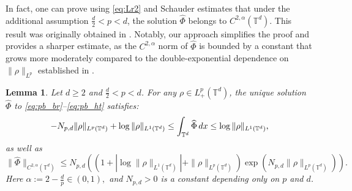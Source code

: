 \documentclass[11pt,reqno,a4paper]{amsart}
\newcommand{\intt}{\int_{\T^d}}
\newtheorem{lemma}{Lemma}[section]
\theoremstyle{definition}
\theoremstyle{remark}
\numberwithin{equation}{section}
\newcommand{\T} {\mathbb T}
\newcommand{\lt}{\left}
\newcommand{\rt}{\right}
\newcommand{\dx}{\textnormal{d}x}
\begin{document}
In fact, one can prove using \eqref{eq:Lr2} and Schauder estimates that under the additional assumption $\frac{d}{2}<p<d$, the solution $\widehat{\Phi}$ belongs to $C^{2,\alpha}(\T^d)$. This result was originally obtained in \cite[Proposition 3.1]{griffinpickeringiacobelli2021Torus}. Notably, our approach simplifies the proof and provides a sharper estimate, as the $C^{2,\alpha}$ norm of $\widehat{\Phi}$ is bounded by a constant that grows more moderately compared to the double-exponential dependence on $\|\rho\|_{L^p}$ established in \cite{griffinpickeringiacobelli2021Torus}.

\begin{lemma} Let $d\ge2$ and $\frac{d}{2}<p<d$. For any $\rho \in L^p_+(\T^d)$, the unique solution $\widehat{\Phi}$ to \eqref{eq:pb_br}--\eqref{eq:pb_ht} satisfies:
\begin{equation}\label{eq:htupplow}
    - N_{p,d} \|\rho\|_{L^p(\T^d)} + \log \|\rho\|_{L^1(\T^d)} \le \intt \widehat{\Phi} \,\dx \le \log \|\rho\|_{L^1(\T^d)},
\end{equation}
as well as
\[
\|\widehat{\Phi}\|_{C^{2,\alpha}(\T^d)} \le N_{p,d}\lt( \lt(1+ |\log \|\rho\|_{L^1(\T^d)}| + \|\rho\|_{L^p(\T^d)}\rt) \exp\lt({N_{p,d}\|\rho\|_{L^p(\T^d)}}\rt)\rt).
\]
Here $\alpha:= 2- \frac{d}{p} \in (0,1),$ and $N_{p,d}>0$ is a constant depending only on $p$ and $d$.
\end{lemma}
\end{document}

